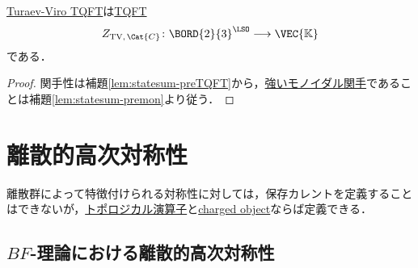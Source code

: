 \documentclass[TQFT_main]{subfiles}
\begin{document}
\begin{myprop}[label=prop:TV-TQFT]{}
    \hyperref[def:TV-TQFT]{Turaev-Viro TQFT}は\hyperref[def:TQFT]{TQFT}
    \begin{align}
        Z_{\text{TV},\, \Cat{C}} \colon \BORD{2}{3}^{\LSO} \lto \VEC{\mathbb{K}}
    \end{align}
    である．
\end{myprop}

\begin{proof}
    関手性は補題\ref{lem:statesum-preTQFT}から，\hyperref[def:monidal-functor]{強いモノイダル関手}であることは補題\ref{lem:statesum-premon}より従う．
\end{proof}


\section{離散的高次対称性}

離散群によって特徴付けられる対称性に対しては，保存カレントを定義することはできないが，\hyperref[def:p-form-sym]{トポロジカル演算子}と\hyperref[def:p-form-sym]{charged object}ならば定義できる．

\subsection{$BF$-理論における離散的高次対称性}
\end{document}
